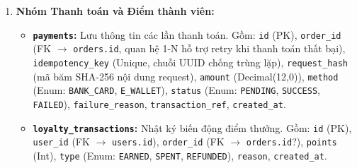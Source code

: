 \documentclass[12pt,a4paper,oneside]{report}
\begin{document}
\begin{enumerate}
    \item \textbf{Nhóm Thanh toán và Điểm thành viên:}
    \begin{itemize}
        \item \textbf{\texttt{payments}:} Lưu thông tin các lần thanh toán. Gồm: \texttt{id} (PK), \texttt{order\_id} (FK \(\to\) \texttt{orders.id}, quan hệ 1-N hỗ trợ retry khi thanh toán thất bại), \texttt{idempotency\_key} (Unique, chuỗi UUID chống trùng lặp), \texttt{request\_hash} (mã băm SHA-256 nội dung request), \texttt{amount} (Decimal(12,0)), \texttt{method} (Enum: \texttt{BANK\_CARD}, \texttt{E\_WALLET}), \texttt{status} (Enum: \texttt{PENDING}, \texttt{SUCCESS}, \texttt{FAILED}), \texttt{failure\_reason}, \texttt{transaction\_ref}, \texttt{created\_at}.
        \item \textbf{\texttt{loyalty\_transactions}:} Nhật ký biến động điểm thưởng. Gồm: \texttt{id} (PK), \texttt{user\_id} (FK \(\to\) \texttt{users.id}), \texttt{order\_id} (FK \(\to\) \texttt{orders.id}?), \texttt{points} (Int), \texttt{type} (Enum: \texttt{EARNED}, \texttt{SPENT}, \texttt{REFUNDED}), \texttt{reason}, \texttt{created\_at}.
    \end{itemize}
\end{enumerate}
\end{document}
